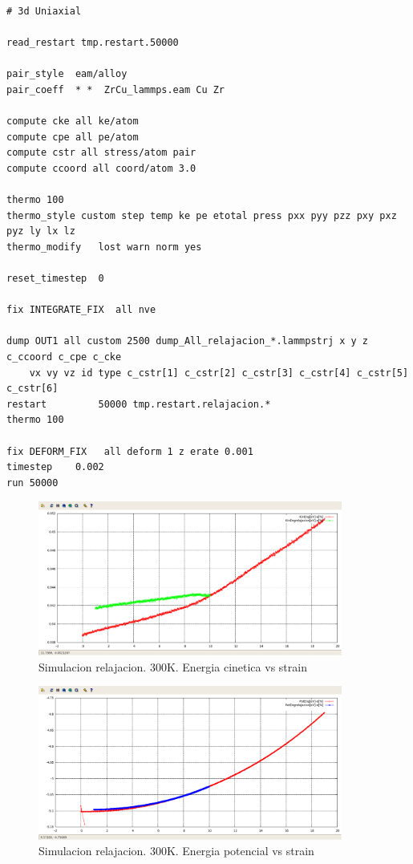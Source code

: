 \documentclass[10pt, oneside]{article} %
\begin{document}
\begin{lstlisting}[caption=script para relajacion]
 # 3d Uniaxial 
 
read_restart tmp.restart.50000

pair_style	eam/alloy 
pair_coeff	* *  ZrCu_lammps.eam Cu Zr 

compute cke all ke/atom
compute cpe all pe/atom
compute cstr all stress/atom pair
compute ccoord all coord/atom 3.0

thermo 100
thermo_style custom step temp ke pe etotal press pxx pyy pzz pxy pxz pyz ly lx lz 
thermo_modify	lost warn norm yes

reset_timestep	0

fix	INTEGRATE_FIX  all nve

dump OUT1 all custom 2500 dump_All_relajacion_*.lammpstrj x y z c_ccoord c_cpe c_cke
    vx vy vz id type c_cstr[1] c_cstr[2] c_cstr[3] c_cstr[4] c_cstr[5] c_cstr[6] 
restart	        50000 tmp.restart.relajacion.* 
thermo 100

fix DEFORM_FIX   all deform 1 z erate 0.001
timestep	0.002
run 50000
\end{lstlisting}

\begin{figure}[H]
\centering
\includegraphics[width=10cm]{Figures/300_Relax_KinEng-deformacion_COMP.png}
\caption{Simulacion relajacion. 300K. Energia cinetica vs strain}
\end{figure}

\begin{figure}[H]
\centering
\includegraphics[width=10cm]{Figures/300_Relax_PotEng-deformacion_COMP.png}
\caption{Simulacion relajacion. 300K. Energia potencial vs strain}
\end{figure}
\end{document}
